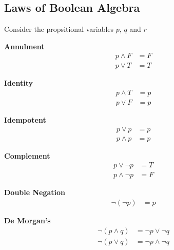 \subsection{Laws of Boolean Algebra}\label{mod1:sexrionBooleanAlgebraLaws}



\noindent Consider the propsitional variables $p$, $q$ and $r$


\begin{law}\label{mod1:law:Annulment}
   \textbf{Annulment}
   \begin{align}
   p \land F &= F  \\
   p \lor T &= T 
   \end{align}
\end{law}


\begin{law}\label{mod1:law:Identity}
   \textbf{Identity}
   \begin{align}
   p \land T &= p  \\
   p \lor F &= p
   \end{align}
\end{law}

\begin{law}\label{mod1:law:Idempotent}
   \textbf{Idempotent}
   \begin{align}
   p \lor p &= p\\
   p \land p &= p
   \end{align}
\end{law}

\begin{law}\label{mod1:law:Complement}
   \textbf{Complement}
   \begin{align}
   p \lor \lnot p &= T\\
   p \land \lnot p &= F
   \end{align}
\end{law}

\begin{law}\label{mod1:law:DoubleNegation}
   \textbf{Double Negation}
   \begin{align}
   \lnot(\lnot p) &= p
   \end{align}
\end{law}

\begin{law}\label{mod1:law:DeMorgan}
   \textbf{De Morgan's}
   \begin{align}
   \lnot (p \land q) &= \lnot p \lor \lnot q \\
   \lnot (p \lor q) &= \lnot p \land \lnot q 
   \end{align}
\end{law}

